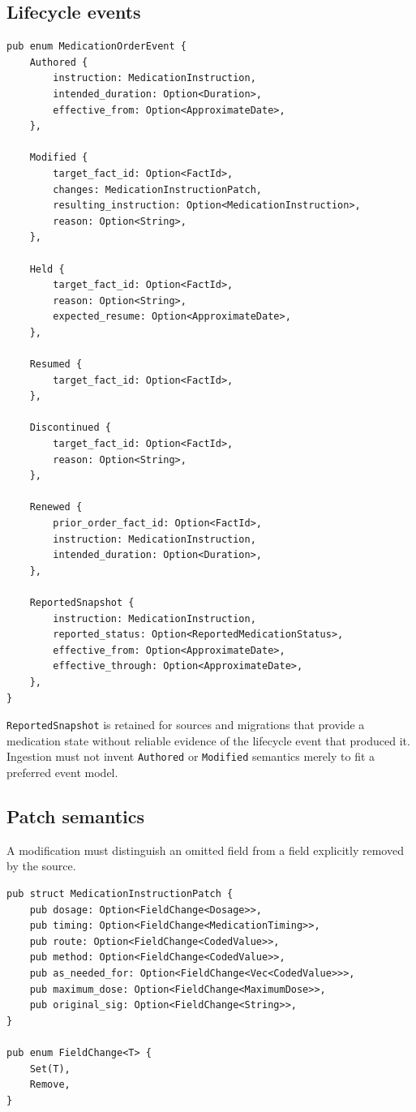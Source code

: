 \documentclass[11pt]{article}
\newcommand{\field}[1]{\texttt{#1}}
\begin{document}
\subsection{Lifecycle events}

\begin{lstlisting}
pub enum MedicationOrderEvent {
    Authored {
        instruction: MedicationInstruction,
        intended_duration: Option<Duration>,
        effective_from: Option<ApproximateDate>,
    },

    Modified {
        target_fact_id: Option<FactId>,
        changes: MedicationInstructionPatch,
        resulting_instruction: Option<MedicationInstruction>,
        reason: Option<String>,
    },

    Held {
        target_fact_id: Option<FactId>,
        reason: Option<String>,
        expected_resume: Option<ApproximateDate>,
    },

    Resumed {
        target_fact_id: Option<FactId>,
    },

    Discontinued {
        target_fact_id: Option<FactId>,
        reason: Option<String>,
    },

    Renewed {
        prior_order_fact_id: Option<FactId>,
        instruction: MedicationInstruction,
        intended_duration: Option<Duration>,
    },

    ReportedSnapshot {
        instruction: MedicationInstruction,
        reported_status: Option<ReportedMedicationStatus>,
        effective_from: Option<ApproximateDate>,
        effective_through: Option<ApproximateDate>,
    },
}
\end{lstlisting}

\field{ReportedSnapshot} is retained for sources and migrations that provide
a medication state without reliable evidence of the lifecycle event that
produced it. Ingestion must not invent \field{Authored} or \field{Modified}
semantics merely to fit a preferred event model.

\subsection{Patch semantics}

A modification must distinguish an omitted field from a field explicitly
removed by the source.

\begin{lstlisting}
pub struct MedicationInstructionPatch {
    pub dosage: Option<FieldChange<Dosage>>,
    pub timing: Option<FieldChange<MedicationTiming>>,
    pub route: Option<FieldChange<CodedValue>>,
    pub method: Option<FieldChange<CodedValue>>,
    pub as_needed_for: Option<FieldChange<Vec<CodedValue>>>,
    pub maximum_dose: Option<FieldChange<MaximumDose>>,
    pub original_sig: Option<FieldChange<String>>,
}

pub enum FieldChange<T> {
    Set(T),
    Remove,
}
\end{lstlisting}
\end{document}

